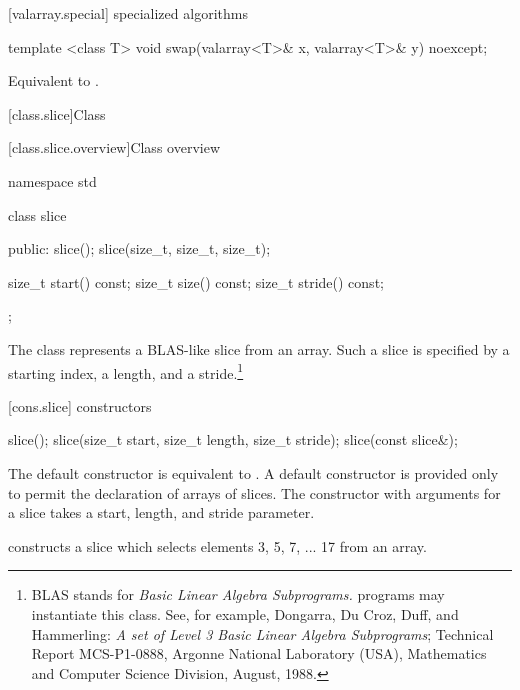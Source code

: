 [valarray.special]{ specialized algorithms}

%
\begin{itemdecl}
template <class T> void swap(valarray<T>& x, valarray<T>& y) noexcept;
\end{itemdecl}

\begin{itemdescr}
\pnum
\effects Equivalent to .
\end{itemdescr}


[class.slice]{Class }

[class.slice.overview]{Class  overview}

%
\begin{codeblock}
namespace std {
  class slice {
  public:
    slice();
    slice(size_t, size_t, size_t);

    size_t start() const;
    size_t size() const;
    size_t stride() const;
  };
}
\end{codeblock}

\pnum
The 
class represents a BLAS-like slice from an array.
Such a slice is specified by a starting index, a length, and a
stride.\footnote{BLAS stands for
\textit{Basic Linear Algebra Subprograms.}
\Cpp programs may instantiate this class.
See, for example,
Dongarra, Du Croz, Duff, and Hammerling:
\textit{A set of Level 3 Basic Linear Algebra Subprograms};
Technical Report MCS-P1-0888,
Argonne National Laboratory (USA),
Mathematics and Computer Science Division,
August, 1988.}

[cons.slice]{ constructors}

%
\begin{itemdecl}
slice();
slice(size_t start, size_t length, size_t stride);
slice(const slice&);
\end{itemdecl}

\begin{itemdescr}
\pnum
The default constructor is equivalent to .
A default constructor is provided only to permit the declaration of arrays of slices.
The constructor with arguments for a slice takes a start, length, and stride
parameter.

\pnum
\begin{example}
constructs a slice which selects elements 3, 5, 7, ... 17 from an array.
\end{example}
\end{itemdescr}


